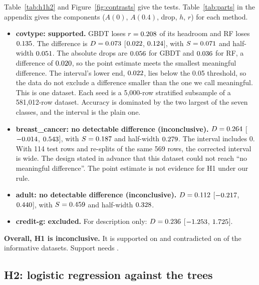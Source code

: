\documentclass[11pt]{article}
\newcommand{\ds}[1]{\textsf{#1}}
\newcommand{\bc}{\ds{breast\_cancer}}
\newcommand{\cg}{\ds{credit-g}}
\newcommand{\ad}{\ds{adult}}
\newcommand{\ct}{\ds{covtype}}
\begin{document}
Table~\ref{tab:h1h2} and Figure~\ref{fig:contrasts} give the tests. Table~\ref{tab:parts}
in the appendix gives the components ($A(0)$, $A(0.4)$, drop, $h$, $r$) for each method.
\begin{itemize}
  \item \textbf{\ct: supported.} GBDT loses $r = 0.208$ of its headroom and RF loses
  $0.135$. The difference is $D = 0.073$ [$0.022$, $0.124$], with
  $S = 0.071$ and half-width $0.051$. The absolute drops are $0.056$ for GBDT
  and $0.036$ for RF, a difference of $0.020$, so the point estimate meets the
  smallest meaningful difference. The interval's lower end, $0.022$, lies below the
  0.05 threshold, so the data do not exclude a difference smaller than the one we call
  meaningful. This is one dataset. Each seed is a 5,000-row stratified subsample of a
  581,012-row dataset. Accuracy is dominated by the two largest of the seven classes, and the
  interval is the plain one.
  \item \textbf{\bc: no detectable difference (inconclusive).} $D = 0.264$
  [$-0.014$, $0.543$], with $S = 0.187$ and half-width $0.279$. The
  interval includes 0. With 114 test rows and re-splits of the same 569 rows, the corrected
  interval is wide. The design stated in advance that this dataset could not reach ``no
  meaningful difference''. The point estimate is not evidence for H1 under our rule.
  \item \textbf{\ad: no detectable difference (inconclusive).} $D = 0.112$
  [$-0.217$, $0.440$], with $S = 0.459$ and half-width $0.328$.
  \item \textbf{\cg: excluded.} For description only: $D = 0.236$
  [$-1.253$, $1.725$].
\end{itemize}
\textbf{Overall, H1 is inconclusive.} It is supported on \HOneNSup{} and contradicted on
\HOneNCon{} of the \HOneNInf{} informative datasets. Support needs \HOneNNeed{}.

\subsection{H2: logistic regression against the trees}
\end{document}
